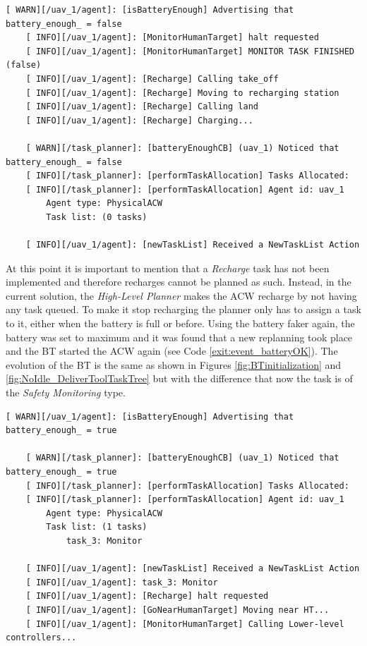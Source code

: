 \begin{lstlisting}[caption={Feedback messages printed after insufficient battery event}, breaklines=true, label=exit:event_battery]
    [ WARN][/uav_1/agent]: [isBatteryEnough] Advertising that battery_enough_ = false
    [ INFO][/uav_1/agent]: [MonitorHumanTarget] halt requested
    [ INFO][/uav_1/agent]: [MonitorHumanTarget] MONITOR TASK FINISHED (false)
    [ INFO][/uav_1/agent]: [Recharge] Calling take_off
    [ INFO][/uav_1/agent]: [Recharge] Moving to recharging station
    [ INFO][/uav_1/agent]: [Recharge] Calling land
    [ INFO][/uav_1/agent]: [Recharge] Charging...
    
    [ WARN][/task_planner]: [batteryEnoughCB] (uav_1) Noticed that battery_enough_ = false
    [ INFO][/task_planner]: [performTaskAllocation] Tasks Allocated:
    [ INFO][/task_planner]: [performTaskAllocation] Agent id: uav_1
        Agent type: PhysicalACW
        Task list: (0 tasks)
    
    [ INFO][/uav_1/agent]: [newTaskList] Received a NewTaskList Action
\end{lstlisting}

At this point it is important to mention that a \emph{Recharge} task has not been implemented and therefore recharges cannot be planned as such. Instead, in the current solution, the \emph{High-Level Planner} makes the \gls{ACW} recharge by not having any task queued. To make it stop recharging the planner only has to assign a task to it, either when the battery is full or before. Using the battery faker again, the battery was set to maximum and it was found that a new replanning took place and the \gls{BT} started the \gls{ACW} again (see Code \ref{exit:event_batteryOK}). The evolution of the \gls{BT} is the same as shown in Figures \ref{fig:BTinitialization} and \ref{fig:NoIdle_DeliverToolTaskTree} but with the difference that now the task is of the \emph{Safety Monitoring} type.

\begin{lstlisting}[caption={Feedback messages printed after enough battery event}, breaklines=true, label=exit:event_batteryOK]
    [ WARN][/uav_1/agent]: [isBatteryEnough] Advertising that battery_enough_ = true

    [ WARN][/task_planner]: [batteryEnoughCB] (uav_1) Noticed that battery_enough_ = true
    [ INFO][/task_planner]: [performTaskAllocation] Tasks Allocated:
    [ INFO][/task_planner]: [performTaskAllocation] Agent id: uav_1
        Agent type: PhysicalACW
        Task list: (1 tasks)
            task_3: Monitor
    
    [ INFO][/uav_1/agent]: [newTaskList] Received a NewTaskList Action
    [ INFO][/uav_1/agent]: task_3: Monitor
    [ INFO][/uav_1/agent]: [Recharge] halt requested
    [ INFO][/uav_1/agent]: [GoNearHumanTarget] Moving near HT...
    [ INFO][/uav_1/agent]: [MonitorHumanTarget] Calling Lower-level controllers...
\end{lstlisting}

